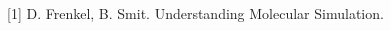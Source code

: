 \documentclass[12pt]{article} %
\begin{document}

\begin{thebibliography}{99} %

[1] D. Frenkel, B. Smit. Understanding Molecular Simulation. 
 
\end{thebibliography}

\end{document}
